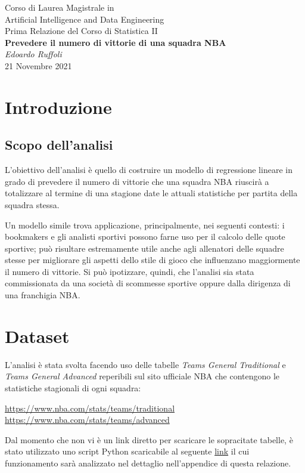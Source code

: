 \documentclass[11pt,a4paper]{article}
\begin{document}
\begin{center}
	\Large{Corso di Laurea Magistrale in \\
	Artificial Intelligence and	Data Engineering}\\
	\vspace{0.2cm}
	\large{Prima Relazione del Corso di Statistica II}\\
	\vspace{0.5cm}
	\Large\textbf{Prevedere il numero di vittorie di una squadra NBA}\\
	\vspace{0.5cm}
	\large\emph{Edoardo Ruffoli}\\
	\vspace{0.5cm}
	\normalsize{21 Novembre 2021}
\end{center}

\tableofcontents
\newpage

\section{Introduzione}
\subsection{Scopo dell'analisi}
L'obiettivo dell'analisi è quello di costruire un modello di regressione lineare in grado di prevedere il numero di vittorie che una squadra NBA riuscirà a totalizzare al termine di una stagione date le attuali statistiche per partita della squadra stessa. 

Un modello simile trova applicazione, principalmente, nei seguenti contesti: i bookmakers e gli analisti sportivi possono farne uso per il calcolo delle quote sportive; può risultare estremamente utile anche agli allenatori delle squadre stesse per migliorare gli aspetti dello stile di gioco che influenzano maggiormente il numero di vittorie.
Si può ipotizzare, quindi, che l'analisi sia stata commissionata da una società di scommesse sportive oppure dalla dirigenza di una franchigia NBA.

\section{Dataset}
L'analisi è stata svolta facendo uso delle tabelle \emph{Teams General Traditional} e \emph{Teams General Advanced} reperibili sul sito ufficiale NBA che contengono le statistiche stagionali di ogni squadra:
\begin{center}
    \url{https://www.nba.com/stats/teams/traditional}\\
    \url{https://www.nba.com/stats/teams/advanced}\\
\end{center}
Dal momento che non vi è un link diretto per scaricare le sopracitate tabelle, è stato utilizzato uno script Python scaricabile al seguente \href{https://raw.githubusercontent.com/edoardoruffoli/Statistics/master/FirstProject/nba_stats_scraper.py}{link} il cui funzionamento sarà analizzato nel dettaglio nell'appendice di questa relazione.
\end{document}
